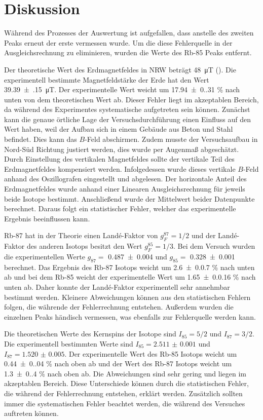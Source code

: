 \section{Diskussion}
\label{sec:diskussion}

Während des Prozesses der Auswertung ist aufgefallen, dass anstelle des zweiten Peaks erneut der erste vermessen wurde.
Um die diese Fehlerquelle in der Ausgleichsrechnung zu eliminieren, wurden die Werte des Rb-85 Peaks entfernt.

Der theoretische Wert des Erdmagnetfeldes in NRW beträgt \qty{48}{\micro\tesla} (\cite{erdmagnetfeldstärke}).
Die experimentell bestimmte Magnetfeldstärke der Erde hat den Wert \qty{39.39(15)}{\micro\tesla}.
Der experimentelle Wert weicht um \num{17.94(0.31)} \% nach unten von dem theoretischen Wert ab.
Dieser Fehler liegt im akzeptablen Bereich, da während des Experimentes systematische aufgetreten sein können.
Zunächst kann die genaue örtliche Lage der Versuchsdurchführung einen Einfluss auf den Wert haben, weil
der Aufbau sich in einem Gebäude aus Beton und Stahl befindet.
Dies kann das $B$-Feld abschirmen.
Zudem musste der Versuchsaufbau in Nord-Süd Richtung justiert werden, dies wurde per Augenmaß abgeschätzt.
Durch Einstellung des vertikalen Magnetfeldes sollte der vertikale Teil des Erdmagnetfeldes kompensiert werden.
Infolgedessen wurde dieses vertikale $B$-Feld anhand des Oszillografen eingestellt und abgelesen.
Der horizontale Anteil des Erdmagnetfeldes wurde anhand einer Linearen Ausgleichsrechnung für jeweils beide Isotope bestimmt.
Anschließend wurde der Mittelwert beider Datenpunkte berechnet.
Daraus folgt ein statistischer Fehler, welcher das experimentelle Ergebnis beeinflussen kann.

Rb-87 hat in der Theorie einen Landé-Faktor von $g_F^{87} = 1/2$ und der Landé-Faktor des anderen Isotops besitzt den Wert $g_F^{85} = 1/3$.
Bei dem Versuch wurden die experimentellen Werte $g_{87} =$ \num{0.487 +- 0.004}  und $g_{85} = $  \num{0.328 +- 0.001} berechnet.
Das Ergebnis des Rb-87 Isotops weicht um \num{2.6(0.07)} \% nach unten ab und bei dem Rb-85 weicht der experimentelle Wert um \num{1.65(0.016)} \% nach unten ab.
Daher konnte der Landé-Faktor experimentell sehr annehmbar bestimmt werden.
Kleinere Abweichungen können aus den statistischen Fehlern folgen, die währende der Fehlerrechnung entstehen.
Außerdem wurden die einzelnen Peaks händisch vermessen, was ebenfalls zur Fehlerquelle werden kann.

Die theoretischen Werte des Kernspins der Isotope sind $I_{85} = 5/2$ und $I_{87} = 3/2$.
Die experimentell bestimmten Werte sind $I_{85} = \num{2.511(1)}$ und $I_{87} = \num{1.520(5)}$.
Der experimentelle Wert des Rb-85 Isotops weicht um \num{0.44(0.04)} \% nach oben ab und der Wert des Rb-87 Isotops weicht um \num{1.3(0.4)} \% nach oben ab.
Die Abweichungen sind sehr gering und liegen im akzeptablen Bereich.
Diese Unterschiede können durch die statistischen Fehler, die während der Fehlerrechnung entstehen, erklärt werden.
Zusätzlich sollten immer die systematischen Fehler beachtet werden, die während des Versuches auftreten können.

